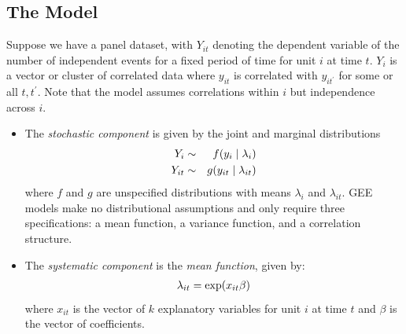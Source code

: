 \documentclass[letterpaper,10pt,english]{sphinxmanual}
\begin{document}
\subsection{The Model}
\label{vignette:id145}
Suppose we have a panel dataset, with \(Y_{it}\) denoting the
dependent variable of the number of independent events for a fixed
period of time for unit \(i\) at time \(t\). \(Y_{i}\) is a
vector or cluster of correlated data where \(y_{it}\) is correlated
with \(y_{it^\prime}\) for some or all \(t, t^\prime\). Note
that the model assumes correlations within \(i\) but independence
across \(i\).
\begin{itemize}
\item {} 
The \emph{stochastic component} is given by the joint and marginal
distributions
\begin{gather}
\begin{split}\begin{aligned}
Y_{i} &\sim& f(y_{i} \mid \lambda_{i})\\
Y_{it} &\sim& g(y_{it} \mid \lambda_{it})\end{aligned}\end{split}\notag
\end{gather}
where \(f\) and \(g\) are unspecified distributions with
means \(\lambda_{i}\) and \(\lambda_{it}\). GEE models make
no distributional assumptions and only require three specifications:
a mean function, a variance function, and a correlation structure.

\item {} 
The \emph{systematic component} is the \emph{mean function}, given by:
\begin{gather}
\begin{split}\lambda_{it}  = \mathrm{exp}(x_{it} \beta)\end{split}\notag
\end{gather}
where \(x_{it}\) is the vector of \(k\) explanatory variables
for unit \(i\) at time \(t\) and \(\beta\) is the vector
of coefficients.


\end{itemize}
\end{document}
